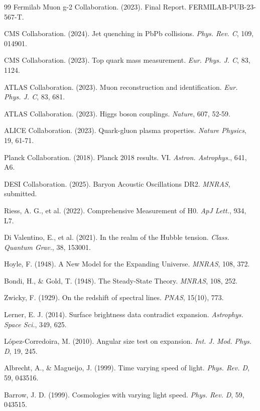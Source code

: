 \begin{thebibliography}{99}
		Fermilab Muon g-2 Collaboration. (2023). Final Report. FERMILAB-PUB-23-567-T.
		
		CMS Collaboration. (2024). Jet quenching in PbPb collisions. \emph{Phys. Rev. C}, 109, 014901.
		
		CMS Collaboration. (2023). Top quark mass measurement. \emph{Eur. Phys. J. C}, 83, 1124.
		
		ATLAS Collaboration. (2023). Muon reconstruction and identification. \emph{Eur. Phys. J. C}, 83, 681.
		
		ATLAS Collaboration. (2023). Higgs boson couplings. \emph{Nature}, 607, 52-59.
		
		ALICE Collaboration. (2023). Quark-gluon plasma properties. \emph{Nature Physics}, 19, 61-71.
		
		Planck Collaboration. (2018). Planck 2018 results. VI. \emph{Astron. Astrophys.}, 641, A6.
		
		DESI Collaboration. (2025). Baryon Acoustic Oscillations DR2. \emph{MNRAS}, submitted.
		
		Riess, A. G., et al. (2022). Comprehensive Measurement of H0. \emph{ApJ Lett.}, 934, L7.
		
		Di Valentino, E., et al. (2021). In the realm of the Hubble tension. \emph{Class. Quantum Grav.}, 38, 153001.
		
		Hoyle, F. (1948). A New Model for the Expanding Universe. \emph{MNRAS}, 108, 372.
		
		Bondi, H., \& Gold, T. (1948). The Steady-State Theory. \emph{MNRAS}, 108, 252.
		
		Zwicky, F. (1929). On the redshift of spectral lines. \emph{PNAS}, 15(10), 773.
		
		Lerner, E. J. (2014). Surface brightness data contradict expansion. \emph{Astrophys. Space Sci.}, 349, 625.
		
		López-Corredoira, M. (2010). Angular size test on expansion. \emph{Int. J. Mod. Phys. D}, 19, 245.
		
		Albrecht, A., \& Magueijo, J. (1999). Time varying speed of light. \emph{Phys. Rev. D}, 59, 043516.
		
		Barrow, J. D. (1999). Cosmologies with varying light speed. \emph{Phys. Rev. D}, 59, 043515.
		

\end{thebibliography}
